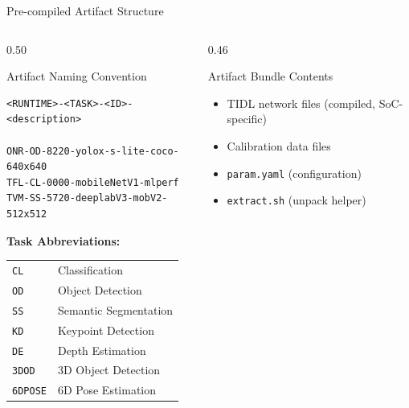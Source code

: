 \documentclass[aspectratio=169,12pt]{beamer}
\begin{document}
\begin{frame}{Pre-compiled Artifact Structure}
  \begin{columns}[T]
    \begin{column}{0.50\textwidth}
      \begin{block}{Artifact Naming Convention}
        \begin{lstlisting}
<RUNTIME>-<TASK>-<ID>-<description>

ONR-OD-8220-yolox-s-lite-coco-640x640
TFL-CL-0000-mobileNetV1-mlperf
TVM-SS-5720-deeplabV3-mobV2-512x512
        \end{lstlisting}
      \end{block}

      \vspace{0.3cm}
      \textbf{Task Abbreviations:}
      \begin{tabular}{ll}
        \texttt{CL} & Classification \\
        \texttt{OD} & Object Detection \\
        \texttt{SS} & Semantic Segmentation \\
        \texttt{KD} & Keypoint Detection \\
        \texttt{DE} & Depth Estimation \\
        \texttt{3DOD} & 3D Object Detection \\
        \texttt{6DPOSE} & 6D Pose Estimation \\
      \end{tabular}
    \end{column}

    \begin{column}{0.46\textwidth}
      \begin{block}{Artifact Bundle Contents}
        \begin{itemize}\footnotesize
          \item TIDL network files (compiled, SoC-specific)
          \item Calibration data files
          \item \texttt{param.yaml} (configuration)
          \item \texttt{extract.sh} (unpack helper)
        \end{itemize}
      \end{block}


\end{column}
\end{columns}
\end{frame}
\end{document}
